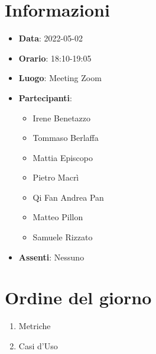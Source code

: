 \section{Informazioni}
	\begin{itemize}
		\item \textbf{Data}: 2022-05-02     %
		\item \textbf{Orario}: 18:10-19:05      %
		\item \textbf{Luogo}: Meeting Zoom
		\item \textbf{Partecipanti}:
		\begin{itemize}
			\item Irene Benetazzo
			\item Tommaso Berlaffa
			\item Mattia Episcopo
			\item Pietro Macrì
			\item Qi Fan Andrea Pan
			\item Matteo Pillon
			\item Samuele Rizzato
		\end{itemize}
        \item \textbf{Assenti}: Nessuno
	\end{itemize}
    
	\section{Ordine del giorno}
	\begin{enumerate}
		\item Metriche
		\item Casi d'Uso
	\end{enumerate}
	\newpage